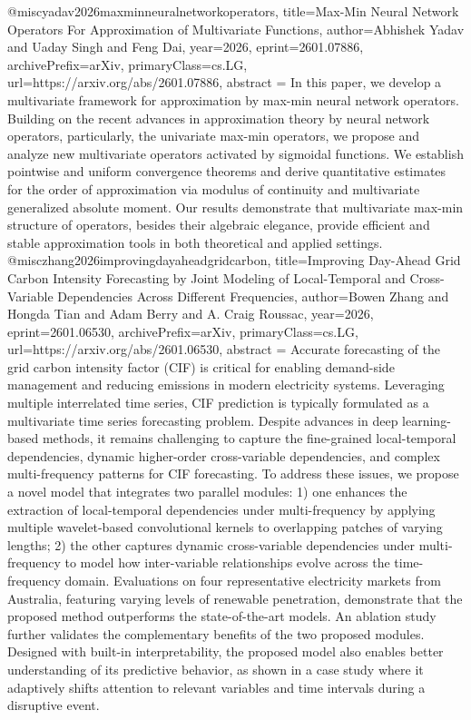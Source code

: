 {}@misc{yadav2026maxminneuralnetworkoperators,
      title={Max-Min Neural Network Operators For Approximation of Multivariate Functions}, 
      author={Abhishek Yadav and Uaday Singh and Feng Dai},
      year={2026},
      eprint={2601.07886},
      archivePrefix={arXiv},
      primaryClass={cs.LG},
      url={https://arxiv.org/abs/2601.07886},
      abstract = {In this paper, we develop a multivariate framework for approximation by max-min neural network operators. Building on the recent advances in approximation theory by neural network operators, particularly, the univariate max-min operators, we propose and analyze new multivariate operators activated by sigmoidal functions. We establish pointwise and uniform convergence theorems and derive quantitative estimates for the order of approximation via modulus of continuity and multivariate generalized absolute moment. Our results demonstrate that multivariate max-min structure of operators, besides their algebraic elegance, provide efficient and stable approximation tools in both theoretical and applied settings.}
}@misc{zhang2026improvingdayaheadgridcarbon,
      title={Improving Day-Ahead Grid Carbon Intensity Forecasting by Joint Modeling of Local-Temporal and Cross-Variable Dependencies Across Different Frequencies}, 
      author={Bowen Zhang and Hongda Tian and Adam Berry and A. Craig Roussac},
      year={2026},
      eprint={2601.06530},
      archivePrefix={arXiv},
      primaryClass={cs.LG},
      url={https://arxiv.org/abs/2601.06530},
      abstract = {Accurate forecasting of the grid carbon intensity factor (CIF) is critical for enabling demand-side management and reducing emissions in modern electricity systems. Leveraging multiple interrelated time series, CIF prediction is typically formulated as a multivariate time series forecasting problem. Despite advances in deep learning-based methods, it remains challenging to capture the fine-grained local-temporal dependencies, dynamic higher-order cross-variable dependencies, and complex multi-frequency patterns for CIF forecasting. To address these issues, we propose a novel model that integrates two parallel modules: 1) one enhances the extraction of local-temporal dependencies under multi-frequency by applying multiple wavelet-based convolutional kernels to overlapping patches of varying lengths; 2) the other captures dynamic cross-variable dependencies under multi-frequency to model how inter-variable relationships evolve across the time-frequency domain. Evaluations on four representative electricity markets from Australia, featuring varying levels of renewable penetration, demonstrate that the proposed method outperforms the state-of-the-art models. An ablation study further validates the complementary benefits of the two proposed modules. Designed with built-in interpretability, the proposed model also enables better understanding of its predictive behavior, as shown in a case study where it adaptively shifts attention to relevant variables and time intervals during a disruptive event.}
}
